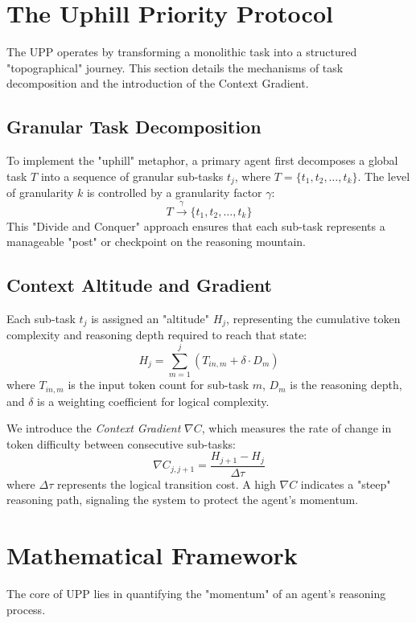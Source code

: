 \documentclass[conference]{IEEEtran}
\begin{document}
\section{The Uphill Priority Protocol}
The UPP operates by transforming a monolithic task into a structured "topographical" journey. This section details the mechanisms of task decomposition and the introduction of the Context Gradient.

\subsection{Granular Task Decomposition}
To implement the "uphill" metaphor, a primary agent first decomposes a global task $T$ into a sequence of granular sub-tasks $t_j$, where $T = \{t_1, t_2, \dots, t_k\}$. The level of granularity $k$ is controlled by a granularity factor $\gamma$:
\begin{equation}
T \xrightarrow{\gamma} \{t_1, t_2, \dots, t_k\}
\end{equation}
This "Divide and Conquer" approach ensures that each sub-task represents a manageable "post" or checkpoint on the reasoning mountain.

\subsection{Context Altitude and Gradient}
Each sub-task $t_j$ is assigned an "altitude" $H_j$, representing the cumulative token complexity and reasoning depth required to reach that state:
\begin{equation}
H_j = \sum_{m=1}^{j} (T_{in, m} + \delta \cdot D_m)
\end{equation}
where $T_{in, m}$ is the input token count for sub-task $m$, $D_m$ is the reasoning depth, and $\delta$ is a weighting coefficient for logical complexity.

We introduce the \textit{Context Gradient} $\nabla C$, which measures the rate of change in token difficulty between consecutive sub-tasks:
\begin{equation}
\nabla C_{j, j+1} = \frac{H_{j+1} - H_j}{\Delta \tau}
\end{equation}
where $\Delta \tau$ represents the logical transition cost. A high $\nabla C$ indicates a "steep" reasoning path, signaling the system to protect the agent's momentum.

\section{Mathematical Framework}
The core of UPP lies in quantifying the "momentum" of an agent's reasoning process.
\end{document}
